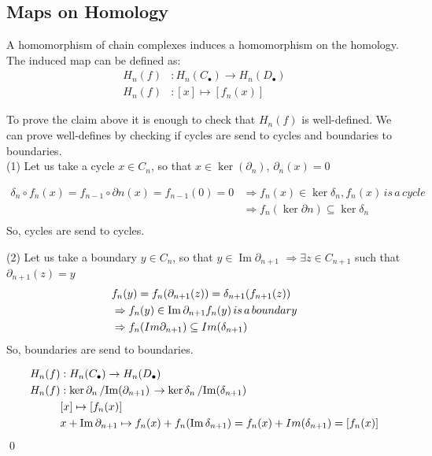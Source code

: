\documentclass[11pt,a4paper]{report}
\DeclareMathOperator{\Ima}{Im}
\begin{document}
    \subsection{Maps on Homology}


                A homomorphism of chain complexes induces a homomorphism on the homology.
                The induced map can be defined as:
               \begin{align*}
                  H_n(f) &:  H_n(C_\bullet) \rightarrow H_n(D_\bullet)  \\
                  H_n(f) &: [x] \mapsto [f_n(x)]
                \end{align*}

                To prove the claim above it is enough to check that $H_n(f)$ is well-defined.
                We can prove well-defines by checking if cycles are send to cycles and boundaries to boundaries. \\

                (1) Let us take a cycle $x \in C_n$, so that $x \in \ker (\partial_n)$, $\partial_n(x) = 0$

                    \begin{align*}
                        \delta_n \circ f_n(x) = f_{n-1} \circ \partial n(x) = f_{n-1}(0) = 0
                        &\Rightarrow f_n(x) \in \ker \delta_n , f_n(x) \, is \, a \, cycle \\
                        &\Rightarrow f_n(\ker \partial n) \subseteq \ker \delta_n \\
                    \end{align*}
                So, cycles are send to cycles.

                (2) Let us take a boundary $y \in C_n$, so that $y \in \Ima\partial_{n+1}$
                $\Rightarrow \exists z \in C_{n+1}$ such that $\partial_{n+1}(z) = y$
                \begin{align*}
                  &\null f_n(y) = f_n(\partial_{n+1}(z))  = \delta_{n+1}(f_{n+1}(z)) \\
                  &\null \Rightarrow f_n(y) \in \Ima\partial_{n+1} f_n(y) \, is \, a \, boundary\\
                  &\null \Rightarrow f_n(Im\partial_{n+1}) \subseteq Im(\delta_{n+1})
                \end{align*}
                So, boundaries are send to boundaries.

                \begin{align*}
                   H_n(f) &:  H_n(C_\bullet) \rightarrow H_n(D_\bullet)  \\
                   H_n(f) &:  \ker{\partial_n} \left/ \Ima(\partial_{n+1}) \right. \rightarrow \ker{\delta_n} \left/ \Ima(\delta_{n+1}) \right. \\
                             & [x] \mapsto [f_n(x)] \\
                             & x + \Ima\partial_{n+1} \mapsto f_n(x) + f_n(\Ima\delta_{n+1}) =  f_n(x) + Im(\delta_{n+1}) = [f_n(x)]
                \end{align*} \qed
\end{document}
